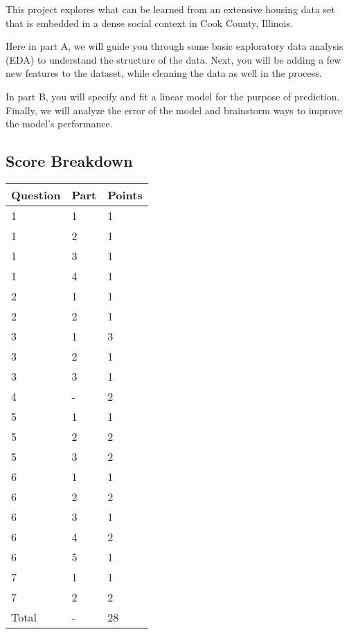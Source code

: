 \documentclass[11pt]{article}
\begin{document}
This project explores what can be learned from an extensive housing data
set that is embedded in a dense social context in Cook County, Illinois.

Here in part A, we will guide you through some basic exploratory data
analysis (EDA) to understand the structure of the data. Next, you will
be adding a few new features to the dataset, while cleaning the data as
well in the process.

In part B, you will specify and fit a linear model for the purpose of
prediction. Finally, we will analyze the error of the model and
brainstorm ways to improve the model's performance.

\hypertarget{score-breakdown}{%
\subsection{Score Breakdown}\label{score-breakdown}}

\begin{longtable}[]{@{}lll@{}}
\toprule()
Question & Part & Points \\
\midrule()
\endhead
1 & 1 & 1 \\
1 & 2 & 1 \\
1 & 3 & 1 \\
1 & 4 & 1 \\
2 & 1 & 1 \\
2 & 2 & 1 \\
3 & 1 & 3 \\
3 & 2 & 1 \\
3 & 3 & 1 \\
4 & - & 2 \\
5 & 1 & 1 \\
5 & 2 & 2 \\
5 & 3 & 2 \\
6 & 1 & 1 \\
6 & 2 & 2 \\
6 & 3 & 1 \\
6 & 4 & 2 \\
6 & 5 & 1 \\
7 & 1 & 1 \\
7 & 2 & 2 \\
Total & - & 28 \\
\bottomrule()
\end{longtable}
\end{document}
